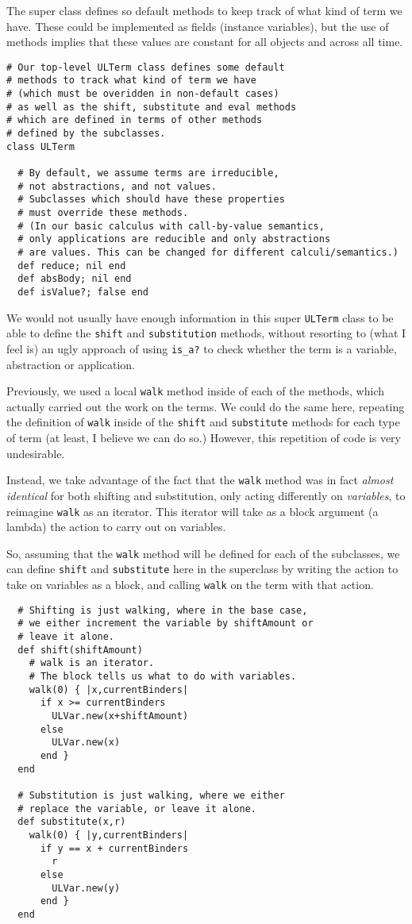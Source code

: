 \documentclass[11pt]{article}
\theoremstyle{definition}
\begin{document}
The super class defines so default methods to keep track
of what kind of term we have.
These could be implemented as fields (instance variables),
but the use of methods implies that these values are constant
for all objects and across all time.
\begin{verbatim}
# Our top-level ULTerm class defines some default
# methods to track what kind of term we have
# (which must be overidden in non-default cases)
# as well as the shift, substitute and eval methods
# which are defined in terms of other methods
# defined by the subclasses.
class ULTerm

  # By default, we assume terms are irreducible,
  # not abstractions, and not values.
  # Subclasses which should have these properties
  # must override these methods.
  # (In our basic calculus with call-by-value semantics,
  # only applications are reducible and only abstractions
  # are values. This can be changed for different calculi/semantics.)
  def reduce; nil end
  def absBody; nil end
  def isValue?; false end
\end{verbatim}

We would not usually have enough information in this super \texttt{ULTerm} class
to be able to define the \texttt{shift} and \texttt{substitution} methods,
without resorting to (what I feel is) an ugly approach of using \texttt{is\_a?} to check
whether the term is a variable, abstraction or application.

Previously, we used a local \texttt{walk} method inside of each of
the methods, which actually carried out the work on the terms.
We could do the same here, repeating the definition of \texttt{walk} inside of
the \texttt{shift} and \texttt{substitute} methods for each type of term
(at least, I believe we can do so.)
However, this repetition of code is very undesirable.

Instead, we take advantage of the fact that the \texttt{walk} method
was in fact \emph{almost identical} for both shifting and substitution,
only acting differently on \emph{variables}, to reimagine \texttt{walk} as
an iterator. This iterator will take as a block argument (a lambda)
the action to carry out on variables.

So, assuming that the \texttt{walk} method will be defined for each of the subclasses,
we can define \texttt{shift} and \texttt{substitute} here in the superclass
by writing the action to take on variables as a block,
and calling \texttt{walk} on the term with that action.
\begin{verbatim}
  # Shifting is just walking, where in the base case,
  # we either increment the variable by shiftAmount or
  # leave it alone.
  def shift(shiftAmount)
    # walk is an iterator.
    # The block tells us what to do with variables.
    walk(0) { |x,currentBinders|
      if x >= currentBinders
        ULVar.new(x+shiftAmount)
      else
        ULVar.new(x)
      end }
  end

  # Substitution is just walking, where we either
  # replace the variable, or leave it alone.
  def substitute(x,r)
    walk(0) { |y,currentBinders|
      if y == x + currentBinders
        r
      else
        ULVar.new(y)
      end }
  end
\end{verbatim}
\end{document}
